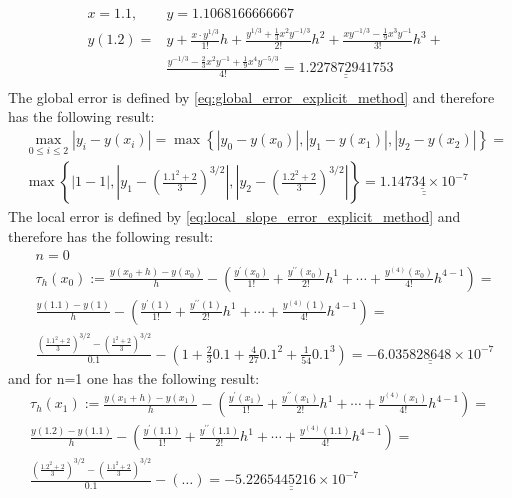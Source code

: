 $$
\begin{aligned}
&x=1.1, &y=1.1068166666667\\
&y(1.2)=& y+\frac{x \cdot y^{1/3}}{1 !} h+\frac{y^{1 / 3}+\frac{1}{3} x^2 y^{-1 / 3}}{2 !} h^2+\frac{x y^{-1 / 3}-\frac{1}{9} x^3 y^{-1}}{3 !} h^3+\\&&\frac{y^{-1 / 3}-\frac{2}{3} x^2 y^{-1}+\frac{1}{9} x^4 y^{-5 / 3}}{4 !}=\underline{\underline{1.227872941753}}\\
\end{aligned}
$$
The global error is defined by \autoref{eq:global_error_explicit_method} and therefore has the following result:
$$
\begin{aligned}
& \max _{0 \leq i \leq 2}\left|y_i-y\left(x_i\right)\right|=\max \left\{\left|y_0-y\left(x_0\right)\right|,\left|y_1-y\left(x_1\right)\right|,\left|y_2-y\left(x_2\right)\right|\right\}= \\
& \max \left\{|1-1|,\left|y_1-\left(\frac{1.1^2+2}{3}\right)^{3 / 2}\right|,\left|y_2-\left(\frac{1.2^2+2}{3}\right)^{3 / 2}\right|\right\}=\underline{\underline{1.1473 \underline{4} \times 10^{-7}}}
\end{aligned}
$$
The local error is defined by \autoref{eq:local_slope_error_explicit_method} and therefore has the following result:
$$
\begin{aligned}
&n=0\\
& \tau_h\left(x_0\right):=\frac{y\left(x_0+h\right)-y\left(x_0\right)}{h}-\left(\frac{y^{\prime}\left(x_0\right)}{1 !}+\frac{y^{\prime \prime}\left(x_0\right)}{2 !} h^1+\cdots+\frac{y^{(4)}\left(x_0\right)}{4 !} h^{4-1}\right)= \\
& \frac{y(1.1)-y(1)}{h}-\left(\frac{y^{\prime}(1)}{1 !}+\frac{y^{\prime \prime}(1)}{2 !} h^1+\cdots+\frac{y^{(4)}(1)}{4 !} h^{4-1}\right)= \\
& \frac{\left(\frac{1.1^2+2}{3}\right)^{3 / 2}-\left(\frac{1^2+2}{3}\right)^{3 / 2}}{0.1}-\left(1+\frac{2}{3} 0.1+\frac{4}{27} 0.1^2+\frac{1}{54} 0.1^3\right)=\underline{\underline{-6.035828648 \times 10^{-7}}}
\end{aligned}
$$
and for n=1 one has the following result:
$$
\begin{gathered}
\tau_h\left(x_1\right):=\frac{y\left(x_1+h\right)-y\left(x_1\right)}{h}-\left(\frac{y^{\prime}\left(x_1\right)}{1 !}+\frac{y^{\prime \prime}\left(x_1\right)}{2 !} h^1+\cdots+\frac{y^{(4)}\left(x_1\right)}{4 !} h^{4-1}\right)= \\
\frac{y(1.2)-y(1.1)}{h}-\left(\frac{y^{\prime}(1.1)}{1 !}+\frac{y^{\prime \prime}(1.1)}{2 !} h^1+\cdots+\frac{y^{(4)}(1.1)}{4 !} h^{4-1}\right)= \\
\frac{\left(\frac{1.2^2+2}{3}\right)^{3 / 2}-\left(\frac{1.1^2+2}{3}\right)^{3 / 2}}{0.1}-(\ldots)=\underline{\underline{-5.2265445216 \times 10^{-7}}}
\end{gathered}
$$








